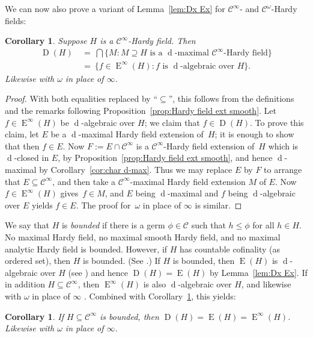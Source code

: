 \documentclass[]{amsart}
\numberwithin{equation}{section}
\def\c {\mathcal{C}}
\def \Ex{\operatorname{E}}
\def \Dx{\operatorname{D}}
\def \d{\operatorname{d}}
\newtheorem{cor}[theorem]{Corollary}
\theoremstyle{definition}
\theoremstyle{remark}
\renewcommand\leq{\leqslant}
\renewcommand\le{\leq}
\def \Ginf{\mathcal{C}^{\infty}}
\def \Gom{\mathcal{C}^{\omega}}
\begin{document}
\noindent
We can now also prove a variant of Lemma~\ref{lem:Dx Ex}   for $\Ginf$- and $\Gom$-Hardy fields:

\begin{cor}\label{cor:D(H) smooth}
Suppose $H$ is a $\Ginf$-Hardy field. Then
\begin{align*}
\operatorname{D}(H)\ &=\ \bigcap\big\{ M: \text{$M\supseteq H$ is a $\d$-maximal $\Ginf$-Hardy field} \big\} \\
&=\ \big\{ f\in \operatorname{E}^\infty(H): \text{$f$ is $\d$-algebraic over $H$}\big\}.
\end{align*}
Likewise with $\omega$ in place of $\infty$.
\end{cor}
\begin{proof}
With both equalities replaced by  ``$\subseteq$'', this follows from the definitions and the remarks
following Proposition~\ref{prop:Hardy field ext smooth}.
Let $f\in \operatorname{E}^\infty(H)$ be $\d$-algebraic over $H$; we claim that $f\in\operatorname{D}(H)$.
To prove this claim, let $E$ be a $\d$-maximal Hardy field extension of~$H$; it is enough to show that then $f\in E$.
Now $F:=E\cap\Ginf$ is a $\Ginf$-Hardy field extension of~$H$ which is $\d$-closed in $E$, by Proposition~\ref{prop:Hardy field ext smooth}, and hence $\d$-maximal by Corollary~\ref{cor:char d-max}. Thus we may replace $E$ by $F$ to arrange that $E\subseteq\Ginf$, and then take a $\Ginf$-maximal Hardy field
extension $M$ of $E$. Now~$f\in \operatorname{E}^\infty(H)$ gives~$f\in M$, and $E$ being $\d$-maximal and $f$ being $\d$-algebraic over $E$ yields $f\in E$. The proof for~$\omega$ in place of $\infty$ is similar.
\end{proof}

\noindent
We say that $H$ is {\it bounded}\/ if there is a germ $\phi\in\c$ such that $h\le \phi$ for all $h\in H$.
No maximal Hardy field, no maximal smooth Hardy field, and no maximal analytic Hardy field
is bounded. However,
if $H$ has countable cofinality (as ordered set), then $H$ is bounded. (See \cite[Section~5]{ADH5}.)
If $H$ is bounded, then $\Ex(H)$ is $\d$-algebraic over $H$ (see \cite[Theorem~5.20]{ADH5}) and hence $\Dx(H)=\Ex(H)$ by Lemma~\ref{lem:Dx Ex}. 
If in addition $H\subseteq\c^\infty$, then $\Ex^\infty(H)$ is also $\d$-algebraic over $H$, and likewise
with $\omega$ in place of $\infty$  \cite[Theorem~5.20]{ADH5}. 
Combined  with Corollary~\ref{cor:D(H) smooth}, this yields:

\begin{cor}\label{cor:Bosh Conj 1}
If $H\subseteq\Ginf$ is  bounded, then $\Dx(H)=\Ex(H)=\Ex^\infty(H)$. Likewise with $\omega$ in place of $\infty$.
\end{cor}
\end{document}

